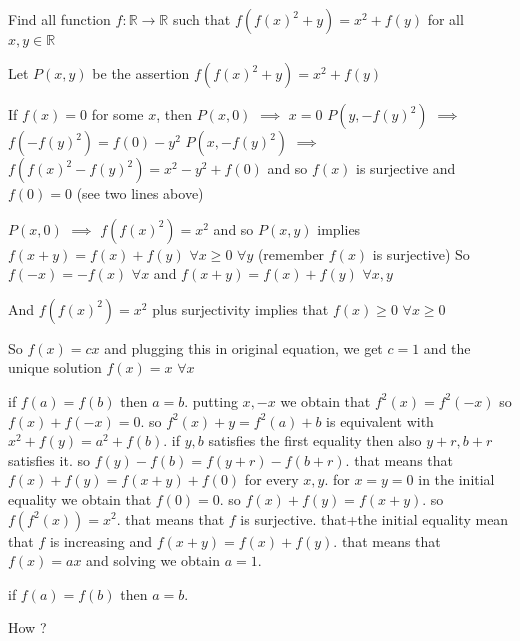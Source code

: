 \begin{solution}
	\begin{tcolorbox}Find all function $f : \mathbb{R} \rightarrow \mathbb{R}$ such that $f(f(x)^2 + y) = x^2 + f(y)$ for all $x, y \in \mathbb{R}$\end{tcolorbox}
Let $P(x,y)$ be the assertion $f(f(x)^2+y)=x^2+f(y)$

If $f(x)=0$ for some $x$, then $P(x,0)$ $\implies$ $x=0$
$P(y,-f(y)^2)$ $\implies$ $f(-f(y)^2)=f(0)-y^2$
$P(x,-f(y)^2)$ $\implies$ $f(f(x)^2-f(y)^2)=x^2-y^2+f(0)$ and so $f(x)$ is surjective and $f(0)=0$ (see two lines above)

$P(x,0)$ $\implies$ $f(f(x)^2)=x^2$ and so $P(x,y)$ implies $f(x+y)=f(x)+f(y)$ $\forall x\ge 0$ $\forall y$ (remember $f(x)$ is surjective)
So $f(-x)=-f(x)$ $\forall x$ and $f(x+y)=f(x)+f(y)$ $\forall x,y$

And $f(f(x)^2)=x^2$ plus surjectivity implies that $f(x)\ge 0$ $\forall x\ge 0$

So $f(x)=cx$ and plugging this in original equation, we get $c=1$ and the unique solution $\boxed{f(x)=x}$ $\forall x$
\end{solution}



\begin{solution}
	if $ f(a)=f(b) $ then $ a=b $.
putting $ x,-x $ we obtain that $ f^{2}(x)=f^{2}(-x) $ so $ f(x)+f(-x)=0 $.
so $ f^{2}(x)+y=f^{2}(a)+b $ is equivalent with $ x^{2}+f(y)=a^{2}+f(b) $.
if $ y,b $ satisfies the first equality then also $ y+r,b+r $ satisfies it. 
so $ f(y)-f(b)=f(y+r)-f(b+r) $.
that means that $ f(x)+f(y)=f(x+y)+f(0) $ for every $ x,y $.
for $ x=y=0 $ in the initial equality we obtain that $ f(0)=0 $.
so $ f(x)+f(y)=f(x+y) $. so $ f(f^{2}(x))=x^{2} $.
that means that $ f $ is surjective.
that+the initial equality mean that $ f $ is increasing and $ f(x+y)=f(x)+f(y) $.
that means that $ f(x)=ax $ and solving we obtain $ a=1 $.
\end{solution}



\begin{solution}
	\begin{tcolorbox}if $ f(a)=f(b) $ then $ a=b $.\end{tcolorbox}
How ?
\end{solution}



